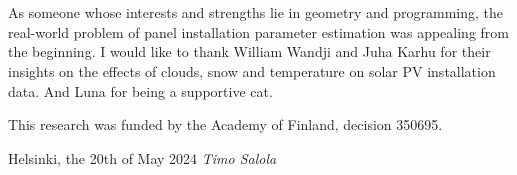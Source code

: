 \hypertarget{prefacepage}{}
%
\section*{\prefacename}
As someone whose interests and strengths lie in geometry and programming, the real-world problem of panel installation parameter estimation was appealing from the beginning. I would like to thank William Wandji and Juha Karhu for their insights on the effects of clouds, snow and temperature on solar PV installation data. And Luna for being a supportive cat.

\vspace{3mm}
\noindent This research was funded by the Academy of Finland, decision 350695.


\vspace{9mm}
\noindent
Helsinki, the 20th of May 2024 %
%
%
\vspace{11mm}
\hspace{1.6cm}\emph{Timo Salola}

\vfill















